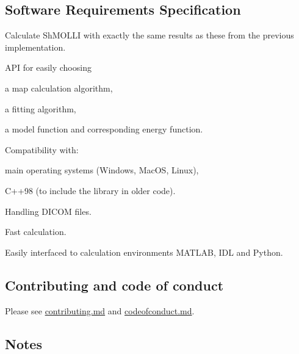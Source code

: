 \subsection*{Software Requirements Specification}


\begin{DoxyEnumerate}
\item Calculate Sh\-M\-O\-L\-L\-I with exactly the same results as these from the previous implementation.
\item A\-P\-I for easily choosing
\begin{DoxyItemize}
\item a map calculation algorithm,
\item a fitting algorithm,
\item a model function and corresponding energy function.
\end{DoxyItemize}
\item Compatibility with\-:
\begin{DoxyItemize}
\item main operating systems (Windows, Mac\-O\-S, Linux),
\item C++98 (to include the library in older code).
\end{DoxyItemize}
\item Handling D\-I\-C\-O\-M files.
\item Fast calculation.
\item Easily interfaced to calculation environments M\-A\-T\-L\-A\-B, I\-D\-L and Python.
\end{DoxyEnumerate}

\subsection*{Contributing and code of conduct}

Please see \hyperlink{md_contributing}{contributing.md} and \hyperlink{md_codeofconduct}{codeofconduct.md}.

\subsection*{Notes}


